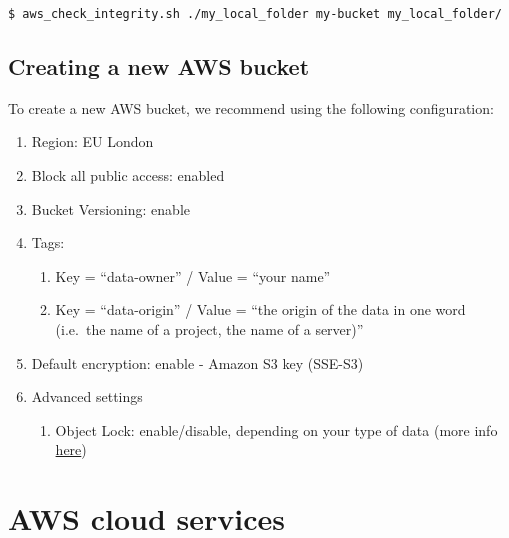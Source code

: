 \documentclass[]{book}
\providecommand{\tightlist}{%
  \setlength{\itemsep}{0pt}\setlength{\parskip}{0pt}}
\begin{document}
\begin{verbatim}
$ aws_check_integrity.sh ./my_local_folder my-bucket my_local_folder/
\end{verbatim}

\subsection{Creating a new AWS bucket}\label{creating-a-new-aws-bucket}

To create a new AWS bucket, we recommend using the following
configuration:

\begin{enumerate}
\def\labelenumi{\arabic{enumi}.}
\tightlist
\item
  Region: EU London
\item
  Block all public access: enabled
\item
  Bucket Versioning: enable
\item
  Tags:

  \begin{enumerate}
  \def\labelenumii{\arabic{enumii}.}
  \tightlist
  \item
    Key = ``data-owner'' / Value = ``your name''
  \item
    Key = ``data-origin'' / Value = ``the origin of the data in one word
    (i.e.~the name of a project, the name of a server)''
  \end{enumerate}
\item
  Default encryption: enable - Amazon S3 key (SSE-S3)
\item
  Advanced settings

  \begin{enumerate}
  \def\labelenumii{\arabic{enumii}.}
  \tightlist
  \item
    Object Lock: enable/disable, depending on your type of data (more
    info
    \href{https://docs.aws.amazon.com/AmazonS3/latest/dev/object-lock.html}{here})
  \end{enumerate}
\end{enumerate}

\section{AWS cloud services}\label{aws-cloud-services}
\end{document}
